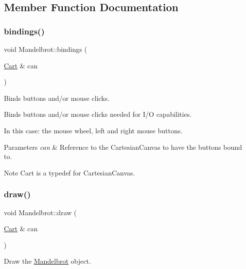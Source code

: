 \subsection{Member Function Documentation}
\mbox{\label{class_mandelbrot_a4b50829db11e2642b616431ae4e2eacf}} 
\subsubsection{\texorpdfstring{bindings()}{bindings()}}
{\footnotesize\ttfamily void Mandelbrot\+::bindings (\begin{DoxyParamCaption}\item[{\hyperlink{classtsgl_1_1_cartesian_canvas}{Cart} \&}]{can }\end{DoxyParamCaption})}



Binds buttons and/or mouse clicks. 

Binds buttons and/or mouse clicks needed for I/O capabilities.

In this case\+: the mouse wheel, left and right mouse buttons. 
\begin{DoxyParams}{Parameters}
{\em can} & Reference to the Cartesian\+Canvas to have the buttons bound to. \\
\hline
\end{DoxyParams}
\begin{DoxyNote}{Note}
Cart is a typedef for Cartesian\+Canvas. 
\end{DoxyNote}
\mbox{\label{class_mandelbrot_ab7918e4de8f00f73290f110ca7a6cffd}} 
\subsubsection{\texorpdfstring{draw()}{draw()}}
{\footnotesize\ttfamily void Mandelbrot\+::draw (\begin{DoxyParamCaption}\item[{\hyperlink{classtsgl_1_1_cartesian_canvas}{Cart} \&}]{can }\end{DoxyParamCaption})\hspace{0.3cm}{\ttfamily [virtual]}}



Draw the \hyperlink{class_mandelbrot}{Mandelbrot} object. 

